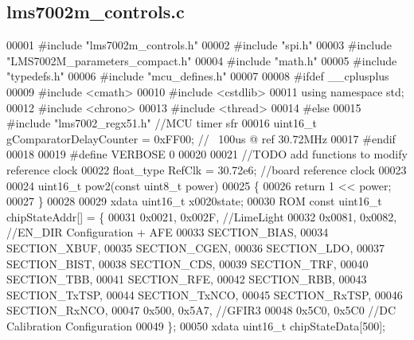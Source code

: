 \subsection{lms7002m\+\_\+controls.\+c}
\label{lms7002m__controls_8c_source}

\begin{DoxyCode}
00001 \textcolor{preprocessor}{#include "lms7002m_controls.h"}
00002 \textcolor{preprocessor}{#include "spi.h"}
00003 \textcolor{preprocessor}{#include "LMS7002M_parameters_compact.h"}
00004 \textcolor{preprocessor}{#include "math.h"}
00005 \textcolor{preprocessor}{#include "typedefs.h"}
00006 \textcolor{preprocessor}{#include "mcu_defines.h"}
00007 
00008 \textcolor{preprocessor}{#ifdef \_\_cplusplus}
00009 \textcolor{preprocessor}{#include <cmath>}
00010 \textcolor{preprocessor}{#include <cstdlib>}
00011 \textcolor{keyword}{using namespace }std;
00012 \textcolor{preprocessor}{#include <chrono>}
00013 \textcolor{preprocessor}{#include <thread>}
00014 \textcolor{preprocessor}{#else}
00015 \textcolor{preprocessor}{#include "lms7002\_regx51.h"} \textcolor{comment}{//MCU timer sfr}
00016 uint16\_t gComparatorDelayCounter = 0xFF00; \textcolor{comment}{// ~100us @ ref 30.72MHz}
00017 \textcolor{preprocessor}{#endif}
00018 
00019 \textcolor{preprocessor}{#define VERBOSE 0}
00020 
00021 \textcolor{comment}{//TODO add functions to modify reference clock}
00022 float_type RefClk = 30.72e6; \textcolor{comment}{//board reference clock}
00023 
00024 uint16\_t pow2(\textcolor{keyword}{const} uint8\_t power)
00025 \{
00026     \textcolor{keywordflow}{return} 1 << power;
00027 \}
00028 
00029 xdata uint16\_t x0020state;
00030 ROM \textcolor{keyword}{const} uint16\_t chipStateAddr[] = \{
00031     0x0021, 0x002F, \textcolor{comment}{//LimeLight}
00032     0x0081, 0x0082, \textcolor{comment}{//EN\_DIR Configuration + AFE}
00033     SECTION_BIAS,
00034     SECTION_XBUF,
00035     SECTION_CGEN,
00036     SECTION_LDO,
00037     SECTION_BIST,
00038     SECTION_CDS,
00039     SECTION_TRF,
00040     SECTION_TBB,
00041     SECTION_RFE,
00042     SECTION_RBB,
00043     SECTION_TxTSP,
00044     SECTION_TxNCO,
00045     SECTION_RxTSP,
00046     SECTION_RxNCO,
00047     0x500, 0x5A7, \textcolor{comment}{//GFIR3}
00048     0x5C0, 0x5C0 \textcolor{comment}{//DC Calibration Configuration}
00049 \};
00050 xdata uint16\_t chipStateData[500];

\end{DoxyCode}
